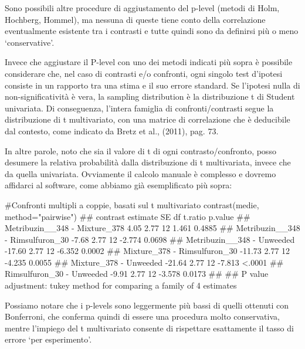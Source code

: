 \documentclass[a4paper,12pt,oneside]{book}
\newenvironment{Shaded}{}{}
\newcommand{\KeywordTok}[1]{#1}
\newcommand{\DataTypeTok}[1]{#1}
\newcommand{\StringTok}[1]{#1}
\newcommand{\CommentTok}[1]{#1}
\newcommand{\NormalTok}[1]{#1}
\begin{document}
Sono possibili altre procedure di aggiustamento del p-level (metodi di Holm, Hochberg, Hommel), ma nessuna di queste tiene conto della correlazione eventualmente esistente tra i contrasti e tutte quindi sono da definirsi più o meno `conservative'.

Invece che aggiustare il P-level con uno dei metodi indicati più sopra è possibile considerare che, nel caso di contrasti e/o confronti, ogni singolo test d'ipotesi consiste in un rapporto tra una stima e il suo errore standard. Se l'ipotesi nulla di non-significatività è vera, la sampling distribution è la distribuzione t di Student univariata. Di conseguenza, l'intera famiglia di confronti/contrasti segue la distribuzione di t multivariato, con una matrice di correlazione che è deducibile dal contesto, come indicato da Bretz et al., (2011), pag. 73.

In altre parole, noto che sia il valore di t di ogni contrasto/confronto, posso desumere la relativa probabilità dalla distribuzione di t multivariata, invece che da quella univariata. Ovviamente il calcolo manuale è complesso e dovremo affidarci al software, come abbiamo già esemplificato più sopra:

\small

\begin{Shaded}
\begin{Highlighting}[]
\CommentTok{#Confronti multipli a coppie, basati sul t multivariato}
\KeywordTok{contrast}\NormalTok{(medie, }\DataTypeTok{method=}\StringTok{"pairwise"}\NormalTok{)}
\CommentTok{##  contrast                         estimate   SE df t.ratio p.value}
\CommentTok{##  Metribuzin__348 - Mixture_378        4.05 2.77 12  1.461  0.4885 }
\CommentTok{##  Metribuzin__348 - Rimsulfuron_30    -7.68 2.77 12 -2.774  0.0698 }
\CommentTok{##  Metribuzin__348 - Unweeded         -17.60 2.77 12 -6.352  0.0002 }
\CommentTok{##  Mixture_378 - Rimsulfuron_30       -11.73 2.77 12 -4.235  0.0055 }
\CommentTok{##  Mixture_378 - Unweeded             -21.64 2.77 12 -7.813  <.0001 }
\CommentTok{##  Rimsulfuron_30 - Unweeded           -9.91 2.77 12 -3.578  0.0173 }
\CommentTok{## }
\CommentTok{## P value adjustment: tukey method for comparing a family of 4 estimates}
\end{Highlighting}
\end{Shaded}

\normalsize

Possiamo notare che i p-levels sono leggermente più bassi di quelli ottenuti con Bonferroni, che conferma quindi di essere una procedura molto conservativa, mentre l'impiego del t multivariato consente di rispettare esattamente il tasso di errore `per esperimento'.
\end{document}
